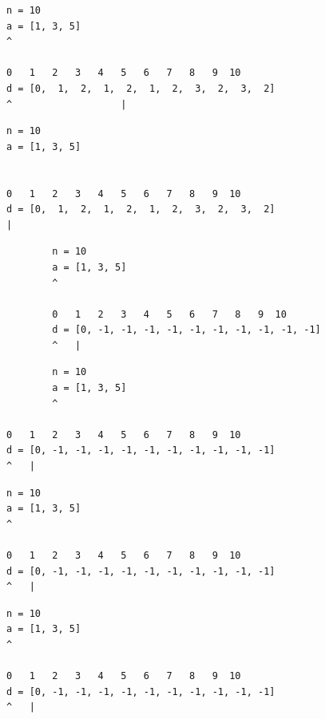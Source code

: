 \begin{frame}[fragile]
\begin{verbatim}
n = 10
a = [1, 3, 5]
^

0   1   2   3   4   5   6   7   8   9  10
d = [0,  1,  2,  1,  2,  1,  2,  3,  2,  3,  2]
^                   |
\end{verbatim}
\end{frame}
\addtocounter{framenumber}{-1}

\begin{frame}[fragile]
\begin{verbatim}
n = 10
a = [1, 3, 5]


0   1   2   3   4   5   6   7   8   9  10
d = [0,  1,  2,  1,  2,  1,  2,  3,  2,  3,  2]
|
\end{verbatim}
        \end{frame}

        \begin{frame}[fragile]
        \begin{verbatim}
        n = 10
        a = [1, 3, 5]
        ^

        0   1   2   3   4   5   6   7   8   9  10
        d = [0, -1, -1, -1, -1, -1, -1, -1, -1, -1, -1]
        ^   |
        \end{verbatim}
        \end{frame}
        \addtocounter{framenumber}{-1}

        \begin{frame}[fragile]
        \begin{verbatim}
        n = 10
        a = [1, 3, 5]
        ^

0   1   2   3   4   5   6   7   8   9  10
d = [0, -1, -1, -1, -1, -1, -1, -1, -1, -1, -1]
^   |
\end{verbatim}
\end{frame}
\addtocounter{framenumber}{-1}

\begin{frame}[fragile]
\begin{verbatim}
n = 10
a = [1, 3, 5]
^

0   1   2   3   4   5   6   7   8   9  10
d = [0, -1, -1, -1, -1, -1, -1, -1, -1, -1, -1]
^   |
\end{verbatim}
\end{frame}
\addtocounter{framenumber}{-1}

\begin{frame}[fragile]
\begin{verbatim}
n = 10
a = [1, 3, 5]
^

0   1   2   3   4   5   6   7   8   9  10
d = [0, -1, -1, -1, -1, -1, -1, -1, -1, -1, -1]
^   |
\end{verbatim}
\end{frame}
\addtocounter{framenumber}{-1}

